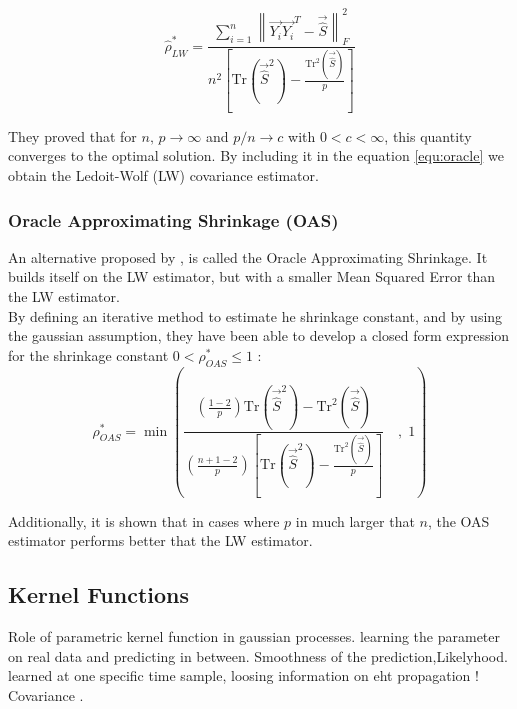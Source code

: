 \begin{equation}
	\hat{\rho}_{LW}^* =  \frac{\sum_{i=1}^n \left\lVert \vec{Y_i}\vec{Y_i}^T - \vec{\hat{S}} \right\rVert_F^2   }{n^2 \left[ \text{Tr}( \vec{\hat{S}} ^2) - \frac{ \text{Tr}^2( \vec{\hat{S}} ) }{p} \right]}
\end{equation}

They proved that for $n,\, p \rightarrow \infty $ and $p/n \rightarrow c $ with $0<c < \infty $, this quantity converges to the optimal solution.  By including it in the equation \ref{equ:oracle} we obtain the Ledoit-Wolf (LW) covariance estimator.



\subsubsection{Oracle Approximating Shrinkage (OAS)}

An alternative proposed by \citet{chen_shrinkage_2010}, is called the Oracle Approximating Shrinkage. It builds itself on the LW estimator, but with a  smaller Mean Squared Error than the LW estimator. \\

By defining an iterative method to estimate he shrinkage constant, and by using the gaussian assumption, they have been able to develop a closed form expression for the shrinkage constant $0 < \rho^*_{OAS}  \leq 1$ : \\

\begin{equation}
	\rho^*_{OAS} = \min \left(   \frac{\left(\frac{1-2}{p}\right) \text{Tr}( \vec{\hat{S}} ^2) -  \text{Tr}^2( \vec{\hat{S}} ) }{\left( \frac{n+1-2}{p}\right)\left[ \text{Tr}( \vec{\hat{S}} ^2) - \frac{ \text{Tr}^2( \vec{\hat{S}} ) }{p} \right] } \quad , \; 1\right)
	\label{equ:cov:shrink:oas}
\end{equation}

Additionally, it is shown that in cases where $p$ in much larger that $n$, the OAS estimator performs better that the LW estimator. 



\subsection{Kernel Functions}



Role of parametric kernel function in gaussian processes. learning the parameter on real data and predicting in between.  Smoothness of the prediction,Likelyhood. learned at one specific time sample, loosing information on eht propagation ! Covariance . \\



